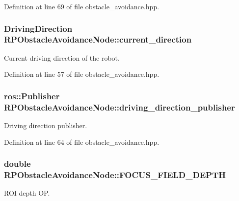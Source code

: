 \-Definition at line 69 of file obstacle\-\_\-avoidance.\-hpp.

\hypertarget{class_r_p_obstacle_avoidance_node_aa5e938ed834639efa94dd19939acdc59}{
\subsubsection[{current\-\_\-direction}]{\setlength{\rightskip}{0pt plus 5cm}\-Driving\-Direction {\bf \-R\-P\-Obstacle\-Avoidance\-Node\-::current\-\_\-direction}}}\label{class_r_p_obstacle_avoidance_node_aa5e938ed834639efa94dd19939acdc59}
\-Current driving direction of the robot. 

\-Definition at line 57 of file obstacle\-\_\-avoidance.\-hpp.

\hypertarget{class_r_p_obstacle_avoidance_node_a1cbdab74a6f919f479eb11bfe043992a}{
\subsubsection[{driving\-\_\-direction\-\_\-publisher}]{\setlength{\rightskip}{0pt plus 5cm}ros\-::\-Publisher {\bf \-R\-P\-Obstacle\-Avoidance\-Node\-::driving\-\_\-direction\-\_\-publisher}}}\label{class_r_p_obstacle_avoidance_node_a1cbdab74a6f919f479eb11bfe043992a}
\-Driving direction publisher. 

\-Definition at line 64 of file obstacle\-\_\-avoidance.\-hpp.

\hypertarget{class_r_p_obstacle_avoidance_node_a5d8b47cc4e9eb4a80a0bfd85d82dbb67}{
\subsubsection[{\-F\-O\-C\-U\-S\-\_\-\-F\-I\-E\-L\-D\-\_\-\-D\-E\-P\-T\-H}]{\setlength{\rightskip}{0pt plus 5cm}double {\bf \-R\-P\-Obstacle\-Avoidance\-Node\-::\-F\-O\-C\-U\-S\-\_\-\-F\-I\-E\-L\-D\-\_\-\-D\-E\-P\-T\-H}}}\label{class_r_p_obstacle_avoidance_node_a5d8b47cc4e9eb4a80a0bfd85d82dbb67}
\-R\-O\-I depth \-O\-P. 

